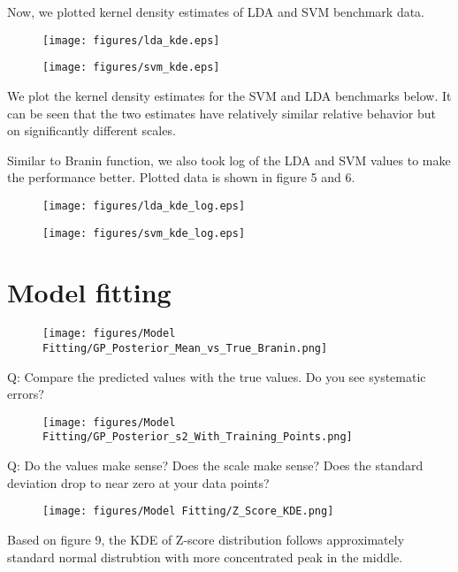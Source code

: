 \documentclass[11pt]{article}
\numberwithin{equation}{section}
\begin{document}
Now, we plotted kernel density estimates of LDA and SVM benchmark data.
\begin{figure}[H]
  \centering
  \texttt{[image: figures/lda\_kde.eps]}
  \caption{}
  \label{}
\end{figure}
\begin{figure}[H]
  \centering
  \texttt{[image: figures/svm\_kde.eps]}
  \caption{}
  \label{}
\end{figure}
We plot the kernel density estimates for the SVM and LDA benchmarks below. 
It can be seen that the two estimates have relatively similar relative
behavior but on significantly different scales.

Similar to Branin function, we also took log of the LDA and SVM values to make the performance better. Plotted data is shown in figure 5 and 6.
\begin{figure}[H]
  \centering
  \texttt{[image: figures/lda\_kde\_log.eps]}
  \caption{}
  \label{}
\end{figure}
\begin{figure}[H]
  \centering
  \texttt{[image: figures/svm\_kde\_log.eps]}
  \caption{}
  \label{}
\end{figure}

\section*{Model fitting}

\begin{figure}[H]
  \centering
  \texttt{[image: figures/Model Fitting/GP\_Posterior\_Mean\_vs\_True\_Branin.png]}
  \caption{}
  \label{}
\end{figure}
Q: Compare
the predicted values with the true values. Do you see systematic errors?

\begin{figure}[H]
  \centering
  \texttt{[image: figures/Model Fitting/GP\_Posterior\_s2\_With\_Training\_Points.png]}
  \caption{}
  \label{}
\end{figure}
Q: Do the values make sense? Does the scale make sense? Does the standard
deviation drop to near zero at your data points?

\begin{figure}[H]
  \centering
  \texttt{[image: figures/Model Fitting/Z\_Score\_KDE.png]}
  \caption{}
  \label{}
\end{figure}
Based on figure 9, the KDE of Z-score distribution follows approximately standard normal distrubtion with more concentrated peak in the middle.
\end{document}

